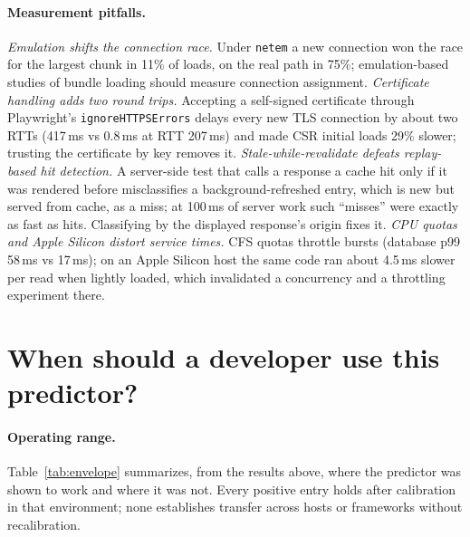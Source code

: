\documentclass[acmsmall,review,nonacm]{acmart}
\begin{document}
\paragraph{Measurement pitfalls.}
\label{sec:pitfalls}
\emph{Emulation shifts the connection race.} Under \texttt{netem} a new connection won the race for the largest chunk in 11\% of loads, on the real path in 75\%; emulation-based studies of bundle loading should measure connection assignment. \emph{Certificate handling adds two round trips.} Accepting a self-signed certificate through Playwright's \texttt{ignoreHTTPSErrors} delays every new TLS connection by about two RTTs (417\,ms vs 0.8\,ms at RTT 207\,ms) and made CSR initial loads 29\% slower; trusting the certificate by key removes it. \emph{Stale-while-revalidate defeats replay-based hit detection.} A server-side test that calls a response a cache hit only if it was rendered before misclassifies a background-refreshed entry, which is new but served from cache, as a miss; at 100\,ms of server work such ``misses'' were exactly as fast as hits. Classifying by the displayed response's origin fixes it. \emph{CPU quotas and Apple Silicon distort service times.} CFS quotas throttle bursts (database p99 58\,ms vs 17\,ms); on an Apple Silicon host the same code ran about 4.5\,ms slower per read when lightly loaded, which invalidated a concurrency and a throttling experiment there.

\section{When should a developer use this predictor?}
\label{sec:use}

\paragraph{Operating range.}
Table~\ref{tab:envelope} summarizes, from the results above, where the predictor was shown to work and where it was not. Every positive entry holds after calibration in that environment; none establishes transfer across hosts or frameworks without recalibration.
\end{document}
